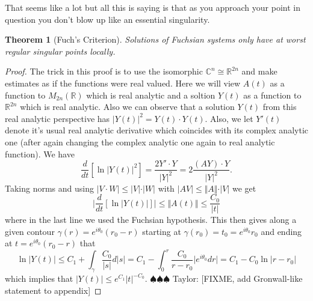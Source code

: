 \documentclass[12pt]{book}
\newcommand{\taylor}[1]{{\color{blue} \sf $\spadesuit\spadesuit\spadesuit$ Taylor: [#1]}}
\numberwithin{equation}{section}
\newtheorem{theorem}{Theorem}[subsection]
\theoremstyle{definition}
\theoremstyle{remark}
\newcommand{\RR}{\mathbb{R}}
\newcommand{\CC}{\mathbb{C}}
\begin{document}
That seems like a lot but all this is saying is that as you approach your point in question you don't blow up like an essential singularity.
\begin{theorem}[Fuch's Criterion]
	Solutions of Fuchsian systems only have at worst regular singular points locally. 
\end{theorem}
\begin{proof}
	The trick in this proof is to use the isomorphic $\CC^n \cong \RR^{2n}$ and make estimates as if the functions were real valued. 
	Here we will view $A(t)$ as a function to $M_{2n}(\RR)$ which is real analytic and a soltion $Y(t)$ as a function to $\RR^{2n}$ which is real analytic. 
	Also we can observe that a solution $Y(t)$ from this real analytic perspective has $\vert Y(t) \vert^2 = Y(t) \cdot Y(t)$. 
	Also, we let $Y'(t)$ denote it's usual real analytic derivative which coincides with its complex analytic one (after again changing the complex analytic one again to real analytic function). 
	We have 
	$$\dfrac{d}{dt}\left[ \ln \vert Y(t) \vert^2 \right] = \dfrac{2 Y'\cdot Y}{\vert Y\vert^2} = 2\frac{ (A Y)\cdot Y}{\vert Y \vert^2}.$$
	 Taking norms and using $\vert V \cdot W \vert \leq \vert V \vert \cdot \vert W \vert$ with $\vert A V \vert \leq \Vert A \Vert \cdot \vert V \vert $ we get  
	  $$ \vert \dfrac{d}{dt}\left[ \ln \vert Y(t) \vert \right] \vert  \leq \Vert A(t) \Vert \leq \frac{C_0}{\vert t \vert}$$ 
	 where in the last line we used the Fuchsian hypothesis.
	 This then gives along a given contour $\gamma(r) = e^{i\theta_0}(r_0-r)$ starting at $\gamma(r_0) = t_0 = e^{i\theta_0}r_0$ and ending at $t=e^{i\theta_0}(r_0-r)$ that $$ \ln\vert Y(t) \vert \leq C_1 + \int_{\gamma}\frac{C_0}{\vert s \vert } d\vert s\vert =  C_1 - \int_{0}^r \frac{C_0}{r-r_0} \vert e^{i\theta_0}dr\vert = C_1 - C_0 \ln \vert r-r_0 \vert $$ 
	 which implies that $\vert Y(t) \vert \leq e^{C_1} \vert t \vert^{-C_0}$.	
	 \taylor{FIXME, add Gronwall-like statement to appendix}
\end{proof}


\end{document}
